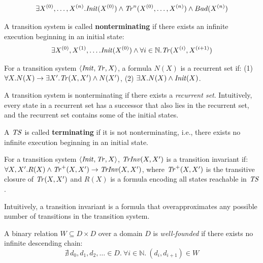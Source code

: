 $$\exists X^{(0)}, \ldots, X^{(n)}. \mathit{Init}(X^{(0)}) \land \mathit{Tr}^{n}(X^{(0)}, \ldots, X^{(n)}) \land Bad(X^{(n)})$$

A transition system is called \textbf{nonterminating} if there exists an infinite execution beginning in an initial state:
$$\exists X^{(0)}, X^{(1)}, \ldots. \mathit{Init}(X^{(0)}) \land \forall i \in \mathbb{N}. \mathit{Tr}(X^{(i)}, X^{(i+1)})$$

\begin{definition}
    For a transition system $\langle  \mathit{Init}, \mathit{Tr}, X  \rangle$, a formula $N(X)$ is a recurrent set if: 
    (1) $\forall X. N(X) \rightarrow \exists X'. \mathit{Tr}(X,X') \land N(X')$,  
    (2) $\exists X. N(X) \land \mathit{Init}(X)$.
\end{definition}

A transition system is nonterminating if there exists a \emph{recurrent set}.
Intuitively, every state in a recurrent set has a successor that also lies in the recurrent set, and the recurrent set contains some of the 
initial states.

A $\mathit{TS}$ is called \textbf{terminating} if it is not nonterminating, i.e., there exists no infinite execution beginning in an initial state.

\begin{definition}
    For a transition system $\langle  \mathit{Init}, \mathit{Tr}, X  \rangle$, $\mathit{TrInv}(X,X')$ is a transition invariant if: $\forall X,X'. R(X) \land \mathit{Tr}^+(X,X') \rightarrow \mathit{TrInv}(X,X')$, where $\mathit{Tr}^+(X,X')$ is the transitive closure of $\mathit{Tr}(X,X')$
    and $R(X)$ is a formula encoding all states reachable in $\mathit{TS}$.
\end{definition}

Intuitively, a transition invariant is a formula that overapproximates any possible number of transitions in the transition system.

\begin{definition}
    A binary relation $W \subseteq D \times D$ over a domain $D$ is \emph{well-founded} if there exists no infinite descending chain:
    $$\nexists\, d_0, d_1, d_2, \ldots \in D.\ 
      \forall i \in \mathbb{N}.\ (d_i, d_{i+1}) \in W$$
\end{definition}


